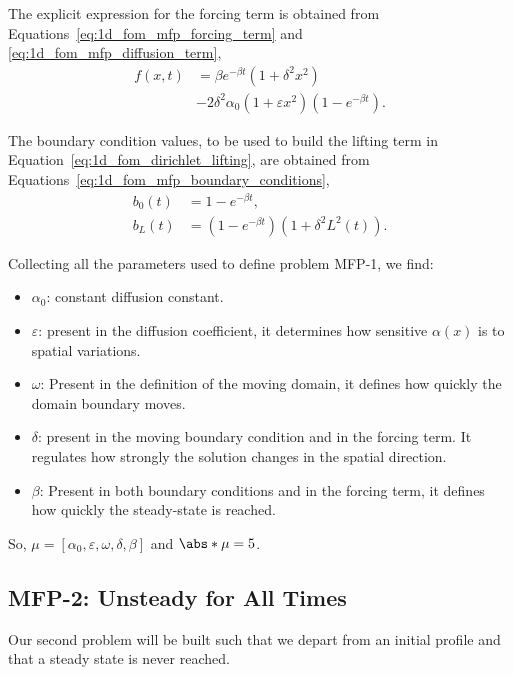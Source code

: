\documentclass[../../main.tex]{subfiles}
\begin{document}
The explicit expression for the forcing term is obtained from Equations~\eqref{eq:1d_fom_mfp_forcing_term} and \eqref{eq:1d_fom_mfp_diffusion_term},
\begin{equation}
    \begin{split}
        f(x,t) &= \beta e^{-\beta t} (1+\delta^2 x^2) \\
        &- 2 \delta^2 \alpha_0(1 + \varepsilon x^2) \left(1 - e^{-\beta t}\right).    
    \end{split}
\end{equation}

The boundary condition values, to be used to build the lifting term in Equation~\eqref{eq:1d_fom_dirichlet_lifting}, are obtained from Equations~\eqref{eq:1d_fom_mfp_boundary_conditions},
\begin{subequations}
    \begin{align}
        b_0(t) &= 1 - e^{-\beta t}, \\
        b_L(t) &= \left(1 - e^{-\beta t}\right)\left(1 + \delta^2 L^{2}(t)\right).
    \end{align}
\end{subequations}

Collecting all the parameters used to define problem MFP-1, we find:
\begin{itemize}
    \item $\alpha_0$: constant diffusion constant. 
    \item $\varepsilon$: present in the diffusion coefficient, it determines how sensitive $\alpha(x)$ is to spatial variations. 
    \item $\omega$: Present in the definition of the moving domain, it defines how quickly the domain boundary moves.
    \item $\delta$: present in the moving boundary condition and in the forcing term. 
    It regulates how strongly the solution changes in the spatial direction.
    \item $\beta$: Present in both boundary conditions and in the forcing term, it defines how quickly the steady-state is reached.
\end{itemize}
So, $\mu = [\alpha_0, \varepsilon, \omega, \delta, \beta]$ and $\abs*{\mu} = 5$.

\subsection{MFP-2: Unsteady for All Times}
Our second problem will be built such that we depart from an initial profile and that a steady state is never reached. 
\end{document}
